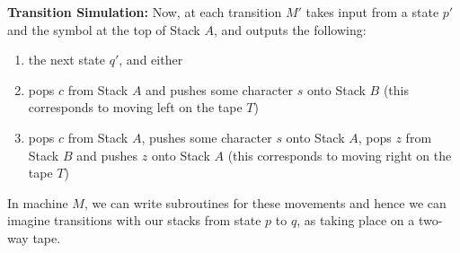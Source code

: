 \documentclass[12pt]{article}
\begin{document}
\begin{solution}
\begin{enumerate}
    \textbf{Transition Simulation:} 
     Now, at each transition $M'$ takes input from a state $p'$ and the symbol at the top of Stack $A$, and outputs the following: 
       \begin{enumerate}
            \item the next state $q'$, and either 
            \item pops $c$ from Stack $A$ and pushes some character $s$ onto Stack $B$ (this corresponds to moving left on the tape $T$)
            \item pops $c$ from Stack $A$, pushes some character $s$ onto Stack $A$, pops $z$ from Stack $B$ and pushes $z$ onto Stack $A$ (this corresponds to moving right on the tape $T$)
       \end{enumerate}

    In machine $M$, we can write subroutines for these movements and hence we can imagine transitions with our stacks from state $p$ to $q$, as taking place on a two-way tape.
\end{enumerate}

\end{solution}
\end{document}
